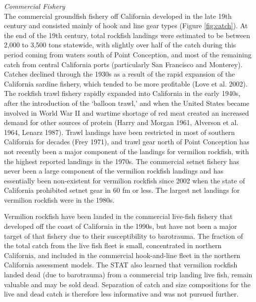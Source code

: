 \documentclass[11pt,
  english,
]{article}
\begin{document}
\leavevmode\tagmcend\tagstructend

\emph{Commercial Fishery}\\
The commercial groundfish fishery off California developed in the late 19th century and consisted mainly of hook and line gear types (Figure \ref{fig:catch}). At the end of the 19th century, total rockfish landings were estimated to be between 2,000 to 3,500 tons statewide, with slightly over half of the catch during this period coming from waters south of Point Conception, and most of the remaining catch from central California ports (particularly San Francisco and Monterey). Catches declined through the 1930s as a result of the rapid expansion of the California sardine fishery, which tended to be more profitable {(Love et al. 2002)\leavevmode\tagmcend\tagstructend}. The rockfish trawl fishery rapidly expanded into California in the early 1940s, after the introduction of the `balloon trawl,' and when the United States became involved in World War II and wartime shortage of red meat created an increased demand for other sources of protein {(Harry and Morgan 1961, Alverson et al. 1964, Lenarz 1987)\leavevmode\tagmcend\tagstructend}. Trawl landings have been restricted in most of southern California for decades {(Frey 1971)\leavevmode\tagmcend\tagstructend}, and trawl gear north of Point Conception has not recently been a major component of the landings for vermilion rockfish, with the highest reported landings in the 1970s. The commercial setnet fishery has never been a large component of the vermilion rockfish landings and has essentially been non-existent for vermilion rockfish since 2002 when the state of California prohibited setnet gear in 60 fm or less. The largest net landings for vermilion rockfish were in the 1980s.

Vermilion rockfish have been landed in the commercial live-fish fishery that developed off the coast of California in the 1990s, but have not been a major target of that fishery due to their susceptibility to barotrauma. The fraction of the total catch from the live fish fleet is small, concentrated in northern California, and included in the commercial hook-and-line fleet in the northern California assessment models. The STAT also learned that vermilion rockfish landed dead (due to barotrauma) from a commercial trip landing live fish, remain valuable and may be sold dead. Separation of catch and size compositions for the live and dead catch is therefore less informative and was not pursued further.
\end{document}
